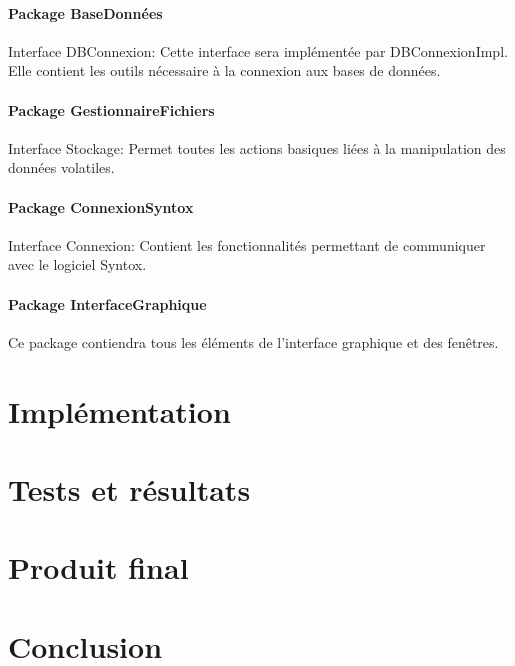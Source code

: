 \documentclass[12pt]{report}
\begin{document}
\subsubsection*{Package BaseDonnées}
Interface DBConnexion: Cette interface sera implémentée par DBConnexionImpl. Elle contient les outils nécessaire à la connexion aux bases de données.

\subsubsection*{Package GestionnaireFichiers}
Interface Stockage: Permet toutes les actions basiques liées à la manipulation des données volatiles.

\subsubsection*{Package ConnexionSyntox}
Interface Connexion: Contient les fonctionnalités permettant de communiquer avec le logiciel Syntox.

\subsubsection*{Package InterfaceGraphique}
Ce package contiendra tous les éléments de l'interface graphique et des fenêtres.



\chapter{Implémentation} %

\chapter{Tests et résultats}

\chapter{Produit final}

\chapter{Conclusion}
\end{document}
